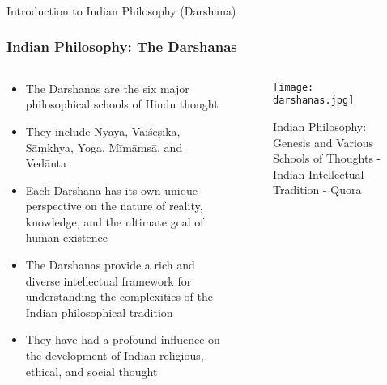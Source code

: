 \begin{frame}[fragile]\frametitle{}
\begin{center}
{\Large Introduction to Indian Philosophy (Darshana)}
\end{center}
\end{frame}

\begin{frame}[fragile]\frametitle{Indian Philosophy: The Darshanas}
\begin{columns}
\begin{column}{0.5\textwidth}
\begin{itemize}
\item The Darshanas are the six major philosophical schools of Hindu thought
\item They include Nyāya, Vaiśeṣika, Sāṃkhya, Yoga, Mīmāṃsā, and Vedānta
\item Each Darshana has its own unique perspective on the nature of reality, knowledge, and the ultimate goal of human existence
\item The Darshanas provide a rich and diverse intellectual framework for understanding the complexities of the Indian philosophical tradition
\item They have had a profound influence on the development of Indian religious, ethical, and social thought
\end{itemize}
\end{column}
\begin{column}{0.5\textwidth}
\begin{figure}
\texttt{[image: darshanas.jpg]}
\caption{Indian Philosophy: Genesis and Various Schools of Thoughts - Indian Intellectual Tradition - Quora}
\end{figure}
\end{column}
\end{columns}
\end{frame}

